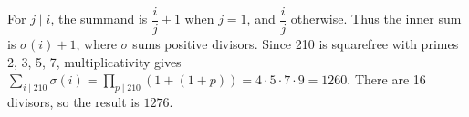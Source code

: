 For $j\mid i$, the summand is $\dfrac{i}{j}+1$ when $j=1$, and $\dfrac{i}{j}$ otherwise. Thus the inner sum is $\sigma(i)+1$, where $\sigma$ sums positive divisors. Since 210 is squarefree with primes 2, 3, 5, 7, multiplicativity gives $\sum_{i\mid210}\sigma(i)=\prod_{p\mid210}(1+(1+p))=4\cdot5\cdot7\cdot9=1260$. There are 16 divisors, so the result is $\boxed{1276}$.

